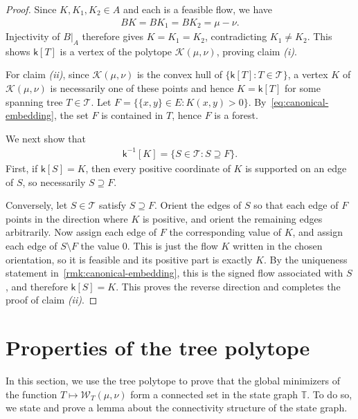 \documentclass[10pt,a4paper]{amsart}
\newcommand{\wass}{{\mathcal{W}}}
\newcommand{\setoftrees}{{\mathcal{T}}}
\newcommand{\stategraph}{{\mathbb{T}}}
\newcommand{\embedding}{{\mathsf{k}}}
\newcommand{\flowpoly}{{\mathcal{K}}}
\begin{document}
\begin{proof}
        Since $K,K_1,K_2\in A$ and each is a feasible flow, we have
            \begin{align*}
                BK = BK_1 = BK_2 = \mu-\nu.
            \end{align*}
        Injectivity of $B|_A$ therefore gives $K=K_1=K_2$, contradicting $K_1\neq K_2$. This shows $\embedding[T]$ is a vertex of the polytope $\flowpoly(\mu,\nu)$, proving claim \emph{(i)}.

        For claim \emph{(ii)}, since $\flowpoly(\mu,\nu)$ is the convex hull of $\{\embedding[T]:T\in\setoftrees\}$, a vertex $K$ of $\flowpoly(\mu,\nu)$ is necessarily one of these points and hence $K=\embedding[T]$ for some spanning tree $T\in\setoftrees$. Let $F = \{\{x,y\}\in E : K(x,y) > 0\}$. By~\cref{eq:canonical-embedding}, the set $F$ is contained in $T$, hence $F$ is a forest.

        We next show that
            \begin{align*}
                \embedding^{-1}[K] = \{S\in\setoftrees : S\supseteq F\}.
            \end{align*}
        First, if $\embedding[S]=K$, then every positive coordinate of $K$ is supported on an edge of $S$, so necessarily $S\supseteq F$.

        Conversely, let $S\in\setoftrees$ satisfy $S\supseteq F$. Orient the edges of $S$ so that each edge of $F$ points in the direction where $K$ is positive, and orient the remaining edges arbitrarily. Now assign each edge of $F$ the corresponding value of $K$, and assign each edge of $S\setminus F$ the value $0$. This is just the flow $K$ written in the chosen orientation, so it is feasible and its positive part is exactly $K$. By the uniqueness statement in~\cref{rmk:canonical-embedding}, this is the signed flow associated with $S$, and therefore $\embedding[S]=K$. This proves the reverse direction and completes the proof of claim \emph{(ii)}.
    \end{proof}

\section{Properties of the tree polytope}\label{sec:connectivity-minimizers}

    In this section, we use the tree polytope to prove that the global minimizers of the function $T\mapsto \wass_T(\mu,\nu)$ form a connected set in the state graph $\stategraph$. To do so, we state and prove a lemma about the connectivity structure of the state graph.
\end{document}
